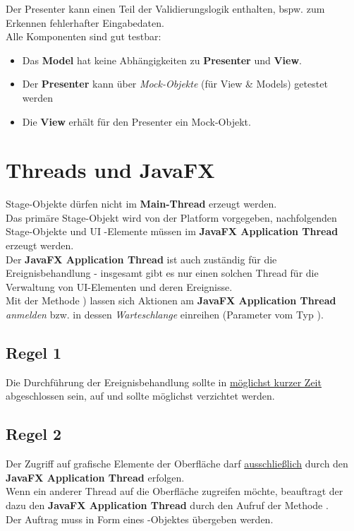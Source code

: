 \noindent
Der Presenter kann einen Teil der Validierungslogik enthalten, bspw. zum Erkennen fehlerhafter Eingabedaten.\\

\noindent
Alle Komponenten sind gut testbar:

\begin{itemize}
    \item Das \textbf{Model} hat keine Abhängigkeiten zu \textbf{Presenter} und \textbf{View}.
    \item Der \textbf{Presenter} kann über \textit{Mock-Objekte} (für View & Models) getestet werden
    \item Die \textbf{View} erhält für den Presenter ein Mock-Objekt.
\end{itemize}

\section{Threads und JavaFX}

Stage-Objekte dürfen nicht im \textbf{Main-Thread} erzeugt werden. \\
Das primäre Stage-Objekt wird von der Platform vorgegeben, nachfolgenden Stage-Objekte und UI -Elemente müssen im \textbf{JavaFX Application Thread} erzeugt werden.\\

\noindent
Der \textbf{JavaFX Application Thread} ist auch zuständig für die Ereignisbehandlung - insgesamt gibt es nur einen solchen Thread für die Verwaltung von UI-Elementen und deren Ereignisse. \\

\noindent
Mit der Methode ) lassen sich Aktionen am \textbf{JavaFX Application Thread} \textit{anmelden} bzw. in dessen \textit{Warteschlange} einreihen (Parameter vom Typ ).\\

\subsection*{Regel 1}
Die Durchführung der Ereignisbehandlung sollte in \ul{möglichst kurzer Zeit} abgeschlossen sein, auf  und  sollte möglichst verzichtet werden.

\subsection*{Regel 2}
Der Zugriff auf grafische Elemente der Oberfläche darf \ul{ausschließlich} durch den \textbf{JavaFX Application Thread} erfolgen.\\
Wenn ein anderer Thread auf die Oberfläche zugreifen möchte, beauftragt der dazu den \textbf{JavaFX Application Thread} durch den Aufruf der Methode .\\
Der Auftrag muss in Form eines -Objektes übergeben werden.\\


